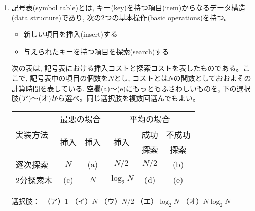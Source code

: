 \documentclass[dvipdfmx,titlepage, 11pt, a4paper]{jsarticle}%
\begin{document}
\begin{enumerate}[(1)]
\item 記号表(symbol table)とは, キー(key)を持つ項目(item)からなるデータ構造(data structure)であり, 次の2つの基本操作(basic operations)を持つ。
  \begin{itemize}
  \item[] 新しい項目を挿入(insert)する
  \item[] 与えられたキーを持つ項目を探索(search)する
  \end{itemize}
  次の表は, 記号表における挿入コストと探索コストを表したものである。ここで, 記号表中の項目の個数を$N$とし, コストとは$N$の関数としておおよその計算時間を表している. 空欄(a)〜(e)に\underline{もっとも}ふさわしいものを, 下の選択肢(ア)〜(オ)から選べ。同じ選択肢を複数回選んでもよい。\\
  \begin{center}
    \begin{tabular}{|l|cc|ccc|} \hline
      \multirow{3}{*}{実装方法}&\multicolumn{2}{|c|}{最悪の場合}&\multicolumn{3}{|c|}{平均の場合} \\ \cline{2-6}
                               &\multirow{2}{*}{挿入}&\multirow{2}{*}{挿入}&\multirow{2}{*}{挿入}&成功&不成功\\ 
                               &&&&探索&探索 \\ \hline
      逐次探索&$N$&(a)&$N/2$&$N/2$&(b)\\
      2分探索木&(c)&$N$&$\log_{2}N$&(d)&(e)\\ \hline
    \end{tabular}
  \end{center}
  \vspace{0.5cm}
  
  \noindent 選択肢：\ （ア）1\hspace{10pt} （イ）$N$\hspace{10pt} （ウ）$N/2$\hspace{10pt} （エ）$\log_{2}N$\hspace{10pt} （オ）$N\log_{2}N$
  

\end{enumerate}
\end{document}
